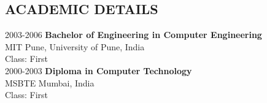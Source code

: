 \documentclass[line, margin]{res}
\begin{document}
\address{8562 Mill Farm Ct Apt-F \\ Indianapolis, IN 46227 \\ +1(317) 970 2178}
\address{bipinbachhao@gmail.com, https://www.linkedin.com/in/bipin-bachhao-8b39b24}


\begin{resume}

\section{ACADEMIC DETAILS}
2003-2006 \textbf{Bachelor of Engineering in Computer Engineering}\\
MIT Pune, University of Pune, India\\
Class: First\\[5pt]
2000-2003 \textbf{Diploma in Computer Technology}\\
MSBTE Mumbai, India\\
Class: First\\[5pt]


\end{resume}
\end{document}
